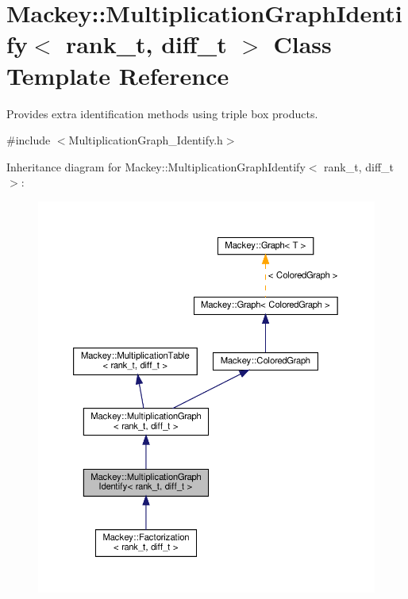 \hypertarget{classMackey_1_1MultiplicationGraphIdentify}{}\section{Mackey\+:\+:Multiplication\+Graph\+Identify$<$ rank\+\_\+t, diff\+\_\+t $>$ Class Template Reference}
\label{classMackey_1_1MultiplicationGraphIdentify}


Provides extra identification methods using triple box products.  




{\ttfamily \#include $<$Multiplication\+Graph\+\_\+\+Identify.\+h$>$}



Inheritance diagram for Mackey\+:\+:Multiplication\+Graph\+Identify$<$ rank\+\_\+t, diff\+\_\+t $>$\+:\nopagebreak
\begin{figure}[H]
\begin{center}
\leavevmode
\includegraphics[width=350pt]{classMackey_1_1MultiplicationGraphIdentify__inherit__graph}
\end{center}
\end{figure}


